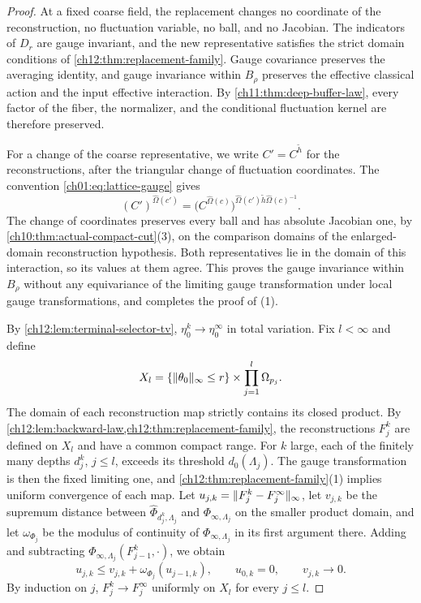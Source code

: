 \begin{proof}
At a fixed coarse field, the replacement changes no coordinate of the reconstruction, no fluctuation variable, no ball, and no Jacobian. The indicators of $D_r$ are gauge invariant, and the new representative satisfies the strict domain conditions of \cref{ch12:thm:replacement-family}. Gauge covariance preserves the averaging identity, and gauge invariance within $B_\rho$ preserves the effective classical action and the input effective interaction. By \cref{ch11:thm:deep-buffer-law}, every factor of the fiber, the normalizer, and the conditional fluctuation kernel are therefore preserved.

For a change of the coarse representative, we write $C'=C^{\widetilde h}$ for the reconstructions, after the triangular change of fluctuation coordinates. The convention \eqref{ch01:eq:lattice-gauge} gives
\begin{equation}\label{ch12:eq:replacement-overlap}
 (C')^{\widehat\Omega(c')}=\bigl(C^{\widehat\Omega(c)}\bigr)^{\widehat\Omega(c')\widetilde h\widehat\Omega(c)^{-1}} .
\end{equation}
The change of coordinates preserves every ball and has absolute Jacobian one, by \cref{ch10:thm:actual-compact-cut}(3), on the comparison domains of the enlarged-domain reconstruction hypothesis. Both representatives lie in the domain of this interaction, so its values at them agree. This proves the gauge invariance within $B_\rho$ without any equivariance of the limiting gauge transformation under local gauge transformations, and completes the proof of (1).

By \cref{ch12:lem:terminal-selector-tv}, $\eta_0^k\to\eta_0^\infty$ in total variation. Fix $l<\infty$ and define
\[
 X_l=\{\lVert \theta_0\rVert_\infty\le r\}\times\prod_{j=1}^l\Omega_{p_j}.
\]
The domain of each reconstruction map strictly contains its closed product. By \cref{ch12:lem:backward-law,ch12:thm:replacement-family}, the reconstructions $F_j^k$ are defined on $X_l$ and have a common compact range. For $k$ large, each of the finitely many depths $d_j^k$, $j\le l$, exceeds its threshold $d_0(\Lambda_j)$. The gauge transformation is then the fixed limiting one, and \cref{ch12:thm:replacement-family}(1) implies uniform convergence of each map. Let $u_{j,k}=\lVert F_j^k-F_j^\infty\rVert_\infty$, let $v_{j,k}$ be the supremum distance between $\widehat\Phi_{d_j^k,\Lambda_j}$ and $\Phi_{\infty,\Lambda_j}$ on the smaller product domain, and let $\omega_{\Phi_j}$ be the modulus of continuity of $\Phi_{\infty,\Lambda_j}$ in its first argument there. Adding and subtracting $\Phi_{\infty,\Lambda_j}(F_{j-1}^k,\cdot)$, we obtain
\begin{equation}\label{ch12:eq:calculation-25}
 u_{j,k}\le v_{j,k}+\omega_{\Phi_j}(u_{j-1,k}),\qquad u_{0,k}=0,\qquad v_{j,k}\longrightarrow0 .
\end{equation}
By induction on $j$, $F_j^k\to F_j^\infty$ uniformly on $X_l$ for every $j\le l$.


\end{proof}
